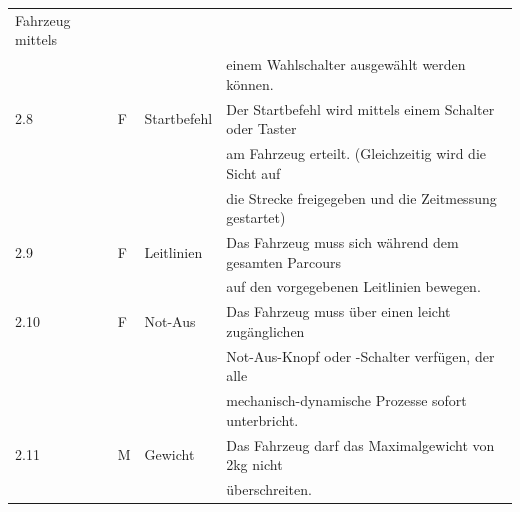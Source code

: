 \documentclass[../main.tex]{subfiles}
\begin{document}
\begin{tabular}{|l|l|l|l|}
  Fahrzeug mittels \\
  & & & einem Wahlschalter ausgewählt werden können. \\
  \hline
  2.8 & F & Startbefehl & Der Startbefehl wird mittels einem Schalter
  oder Taster \\
  & & & am Fahrzeug erteilt. (Gleichzeitig wird die Sicht auf \\
  & & & die Strecke freigegeben und die Zeitmessung gestartet) \\
  \hline
  2.9 & F & Leitlinien & Das Fahrzeug muss sich während dem gesamten Parcours \\
  & & & auf den vorgegebenen Leitlinien bewegen. \\
  \hline
  2.10 & F & Not-Aus & Das Fahrzeug muss über einen leicht zugänglichen \\
  & & & Not-Aus-Knopf oder -Schalter verfügen, der alle \\
  & & & mechanisch-dynamische Prozesse sofort unterbricht. \\
  \hline
  2.11 & M & Gewicht & Das Fahrzeug darf das Maximalgewicht von 2kg nicht \\
  & & & überschreiten. \\
  \hline
\end{tabular}

\newpage
\end{document}
